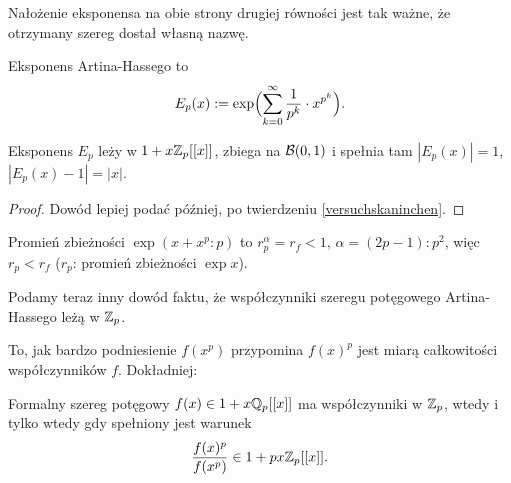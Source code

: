 Nałożenie eksponensa na obie strony drugiej równości jest tak ważne, że otrzymany szereg dostał własną nazwę.

\begin{definicja}
	Eksponens Artina-Hassego to
	\[
		E_p(x) := \exp \Bigl( \sum_{k=0}^\infty \frac{1}{p^k} \cdot x^{p^k}\Bigr).
	\]
\end{definicja}

\begin{fakt}
	Eksponens $E_p$ leży w $1+ x\mathbb Z_p[[x]]$, zbiega na $\mathcal B(0, 1)$ i spełnia tam $|E_p(x)| = 1$, $|E_p(x) - 1| = |x|$.
\end{fakt}

\begin{proof}
	Dowód lepiej podać później, po twierdzeniu \ref{versuchskaninchen}.
\end{proof}

\begin{fakt}
	Promień zbieżności $\exp(x + x^p : p)$ to $r_p^\alpha = r_f < 1$, $\alpha = (2p-1):p^2$, więc $r_p < r_f$ ($r_p$: promień zbieżności $\exp x$).
\end{fakt}

Podamy teraz inny dowód faktu, że współczynniki szeregu potęgowego Artina-Hassego leżą w $\mathbb Z_p$.

To, jak bardzo podniesienie $f(x^p)$ przypomina $f(x)^p$ jest miarą całkowitości współczynników $f$.
Dokładniej:

\begin{twierdzenie} 
	\label{versuchskaninchen}
	Formalny szereg potęgowy $f(x) \in 1+x \mathbb Q_p[[x]]$ ma współczynniki w $\mathbb Z_p$, wtedy i tylko wtedy gdy spełniony jest warunek
	\[
		\frac{f(x)^p}{f(x^p)} \in 1 + px \mathbb Z_p[[x]].
	\]
\end{twierdzenie}

